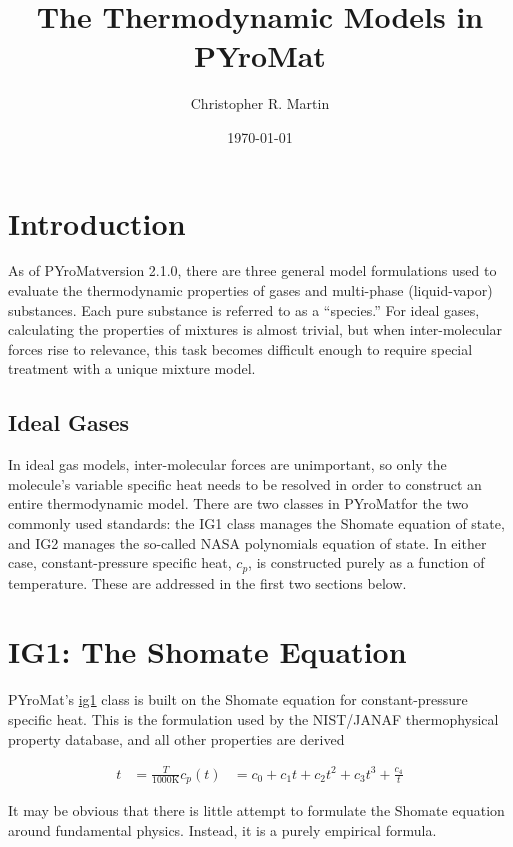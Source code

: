 \documentclass[twocolumn,letterpaper,11pt]{article}
\title{The Thermodynamic Models in PYroMat}
\author{Christopher R. Martin}
\date{\today}
\def\pm{PYroMat}
\begin{document}
\maketitle

\section{Introduction}

As of \pm version 2.1.0, there are three general model formulations used to evaluate the thermodynamic properties of gases and multi-phase (liquid-vapor) substances.  Each pure substance is referred to as a ``species.''  For ideal gases, calculating the properties of mixtures is almost trivial, but when inter-molecular forces rise to relevance, this task becomes difficult enough to require special treatment with a unique mixture model.

\subsection{Ideal Gases}
In ideal gas models, inter-molecular forces are unimportant, so only the molecule's variable specific heat needs to be resolved in order to construct an entire thermodynamic model.  There are two classes in \pm for the two commonly used standards: the IG1 class manages the Shomate equation of state, and IG2 manages the so-called NASA polynomials equation of state.  In either case, constant-pressure specific heat, $c_p$, is constructed purely as a function of temperature.  These are addressed in the first two sections below.


\section{IG1: The Shomate Equation}

\pm's \underline{ig1} class is built on the Shomate equation for constant-pressure specific heat.  This is the formulation used by the NIST/JANAF thermophysical property database, and all other properties are derived 

\begin{align}
t &= \frac{T}{1000 \mathrm{K}}
c_p(t) &= c_0 + c_1 t + c_2 t^2 + c_3 t^3 + \frac{c_4}{t}
\end{align}

It may be obvious that there is little attempt to formulate the Shomate equation around fundamental physics.  Instead, it is a purely empirical formula.  
\end{document}
